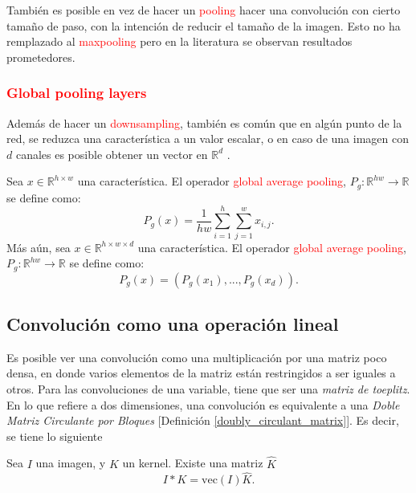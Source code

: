 También es posible en vez de hacer un \textcolor{red}{pooling} hacer una convolución con cierto tamaño de paso, con la intención de reducir el tamaño de la imagen. Esto no ha remplazado al \textcolor{red}{maxpooling} pero en la literatura se observan resultados prometedores. 
\subsubsection{\textcolor{red}{Global pooling layers} }
Además de hacer un \textcolor{red}{downsampling}, también es común que en algún punto de la red, se reduzca una característica a un valor escalar, o en caso de una imagen con $d$ canales es posible obtener un vector en $\mathbb R^d$ \cite{CNNdefinition}.
\begin{definition}
    Sea $x\in \mathbb R^{h\times w}$ una característica. El operador \textcolor{red}{global average pooling}, $P_g: \mathbb R^{hw}\to \mathbb R$ se define como:
    \begin{equation}
        P_g(x) = \frac{1}{hw}\sum_{i=1}^h\sum_{j=1}^w x_{i,j}.
    \end{equation}
    Más aún, sea $x \in \mathbb R^{h\times w \times d}$ una característica. El operador \textcolor{red}{global average pooling}, $P_g: \mathbb R^{hw}\to \mathbb R$ se define como:
    \begin{equation}
        P_g(x) = (P_g(x_1), ..., P_g(x_d)).
    \end{equation}
\end{definition}
\subsection{Convolución como una operación lineal}
 Es posible ver una convolución como una multiplicación por una matriz poco densa, en donde varios elementos de la matriz están restringidos a ser iguales a otros. Para las convoluciones de una variable, tiene que ser una \textsl{matriz de toeplitz}. En lo que refiere a dos dimensiones, una convolución es equivalente a una \textsl{Doble Matriz Circulante por Bloques} [Definición \ref{doubly_circulant_matrix}]. Es decir, se tiene lo siguiente 
 \begin{corollary}
    Sea $I$ una imagen, y $K$ un kernel. Existe una matriz $\hat K$ 
    \begin{equation}
        I*K = \text{vec}(I)\hat K.
    \end{equation}
 \end{corollary}

